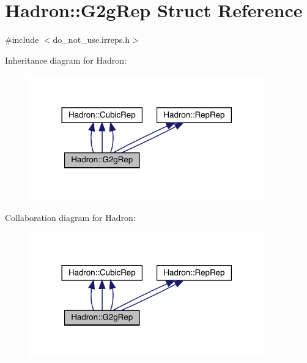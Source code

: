 \hypertarget{structHadron_1_1G2gRep}{}\section{Hadron\+:\+:G2g\+Rep Struct Reference}
\label{structHadron_1_1G2gRep}


{\ttfamily \#include $<$do\+\_\+not\+\_\+use.\+irreps.\+h$>$}



Inheritance diagram for Hadron\+:
\nopagebreak
\begin{figure}[H]
\begin{center}
\leavevmode
\includegraphics[width=288pt]{df/d8f/structHadron_1_1G2gRep__inherit__graph}
\end{center}
\end{figure}


Collaboration diagram for Hadron\+:
\nopagebreak
\begin{figure}[H]
\begin{center}
\leavevmode
\includegraphics[width=288pt]{d5/dee/structHadron_1_1G2gRep__coll__graph}
\end{center}
\end{figure}
